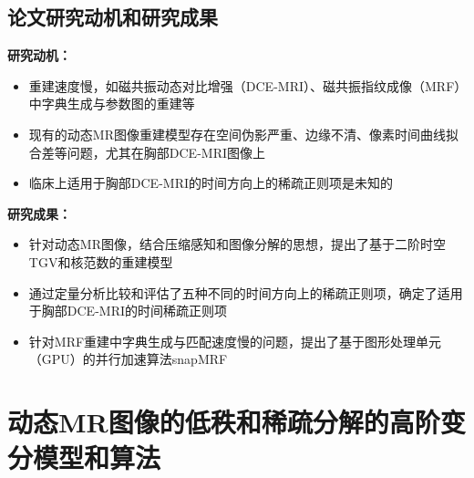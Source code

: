 \documentclass{beamer}
\begin{document}

\subsection{论文研究动机和研究成果}
\begin{frame}
\textbf{研究动机：}
	\begin{itemize}
		\item 重建速度慢，如磁共振动态对比增强（DCE-MRI）、磁共振指纹成像（MRF）中字典生成与参数图的重建等
		\item 现有的动态MR图像重建模型存在空间伪影严重、边缘不清、像素时间曲线拟合差等问题，尤其在胸部DCE-MRI图像上
		\item 临床上适用于胸部DCE-MRI的时间方向上的稀疏正则项是未知的
	\end{itemize}
	\textbf{研究成果：}
	\begin{itemize}
		\item 针对动态MR图像，结合压缩感知和图像分解的思想，提出了基于二阶时空TGV和核范数的重建模型
		\item 通过定量分析比较和评估了五种不同的时间方向上的稀疏正则项，确定了适用于胸部DCE-MRI的时间稀疏正则项
		\item 针对MRF重建中字典生成与匹配速度慢的问题，提出了基于图形处理单元（GPU）的并行加速算法snapMRF
	\end{itemize}
\end{frame}

\section{动态MR图像的低秩和稀疏分解的高阶变分模型和算法}
    \begin{frame}
    \end{frame}
\end{document}
